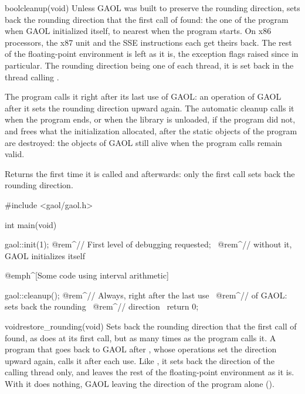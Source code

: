 \begin{deffun}{bool}{cleanup}{(void)}
Unless GAOL was built to preserve the rounding direction, sets back the
rounding direction that the first call of  found: the one of the
program when GAOL initialized itself, to nearest when the program starts. On
x86 processors, the x87 unit and the SSE instructions each get theirs back.
The rest of the floating-point environment is left as it is, the exception
flags raised since in particular. The rounding direction being one of each
thread, it is set back in the thread calling .\newinvfive

The program calls it right after its last use of GAOL: an operation of GAOL
after it sets the rounding direction upward again. The automatic cleanup
calls it when the program ends, or when the library is unloaded, if the
program did not, and frees what the initialization allocated, after the
static objects of the program are destroyed: the objects of GAOL still alive
when the program calls  remain valid.

Returns  the first time it is called and  afterwards:
only the first call sets back the rounding direction.
\end{deffun}

\begin{example}
#include <gaol/gaol.h>

int main(void)
{
  gaol::init(1); @rem^// First level of debugging requested;~
                 @rem^// without it, GAOL initializes itself~

  @emph^[Some code using interval arithmetic]~

  gaol::cleanup(); @rem^// Always, right after the last use~
                   @rem^// of GAOL: sets back the rounding~
                   @rem^// direction~
  return 0;
}
\end{example}

\begin{deffun}{void}{restore\_rounding}{(void)}
Sets back the rounding direction that the first call of  found,
as  does at its first call, but as many times as the program
calls it.\newinvfive{} A program that goes back to GAOL after
, whose operations set the direction upward again, calls it
after each use. Like , it sets back the direction of the
calling thread only, and leaves the rest of the floating-point environment as
it is. With  it does nothing, GAOL leaving
the direction of the program alone ().
\end{deffun}

